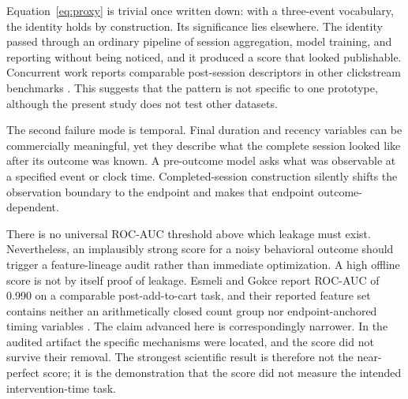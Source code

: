 \documentclass[conference, letterpaper]{IEEEtran}
\begin{document}
Equation~\ref{eq:proxy} is trivial once written down: with a three-event vocabulary, the identity holds by construction. Its significance lies elsewhere. The identity passed through an ordinary pipeline of session aggregation, model training, and reporting without being noticed, and it produced a score that looked publishable. Concurrent work reports comparable post-session descriptors in other clickstream benchmarks \cite{alzghoul2026}. This suggests that the pattern is not specific to one prototype, although the present study does not test other datasets.

The second failure mode is temporal. Final duration and recency variables can be commercially meaningful, yet they describe what the complete session looked like after its outcome was known. A pre-outcome model asks what was observable at a specified event or clock time. Completed-session construction silently shifts the observation boundary to the endpoint and makes that endpoint outcome-dependent.

There is no universal ROC-AUC threshold above which leakage must exist. Nevertheless, an implausibly strong score for a noisy behavioral outcome should trigger a feature-lineage audit rather than immediate optimization. A high offline score is not by itself proof of leakage. Esmeli and Gokce report ROC-AUC of 0.990 on a comparable post-add-to-cart task, and their reported feature set contains neither an arithmetically closed count group nor endpoint-anchored timing variables \cite{esmeli2025}. The claim advanced here is correspondingly narrower. In the audited artifact the specific mechanisms were located, and the score did not survive their removal. The strongest scientific result is therefore not the near-perfect score; it is the demonstration that the score did not measure the intended intervention-time task.
\end{document}
